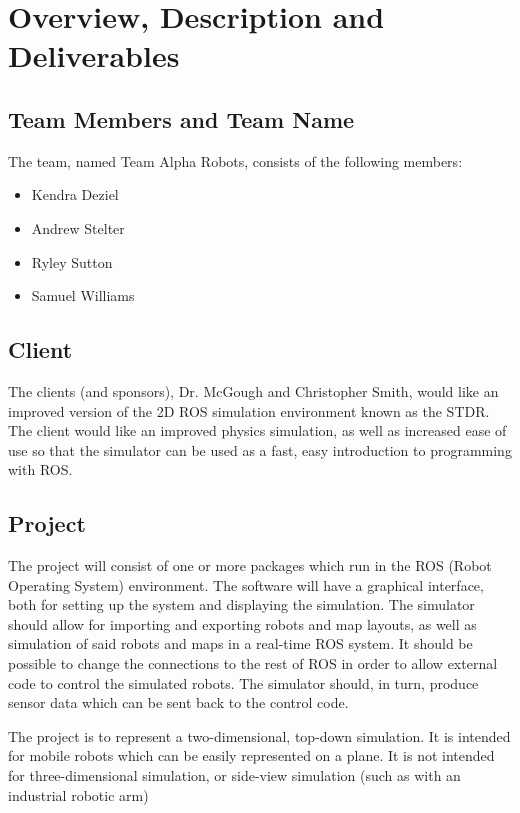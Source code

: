 

\chapter{Overview, Description and Deliverables}

\section{Team Members and Team Name}
The team, named Team Alpha Robots, consists of the following members:
\begin{itemize}
	\item Kendra Deziel
	\item Andrew Stelter
	\item Ryley Sutton
	\item Samuel Williams
\end{itemize}

\section{Client}
The clients (and sponsors), Dr. McGough and Christopher Smith, would like an improved version of the 2D ROS simulation environment known as the STDR. The client would like an improved physics simulation, as well as increased ease of use so that the simulator can be used as a fast, easy introduction to programming with ROS.

\section{Project}
The project will consist of one or more packages which run in the ROS (Robot Operating System) environment. The software will have a graphical interface, both for setting up the system and displaying the simulation. The simulator should allow for importing and exporting robots and map layouts, as well as simulation of said robots and maps in a real-time ROS system. It should be possible to change the connections to the rest of ROS in order to allow external code to control the simulated robots. The simulator should, in turn, produce sensor data which can be sent back to the control code.

The project is to represent a two-dimensional, top-down simulation. It is intended for mobile robots which can be easily represented on a plane. It is not intended for three-dimensional simulation, or side-view simulation (such as with an industrial robotic arm)

